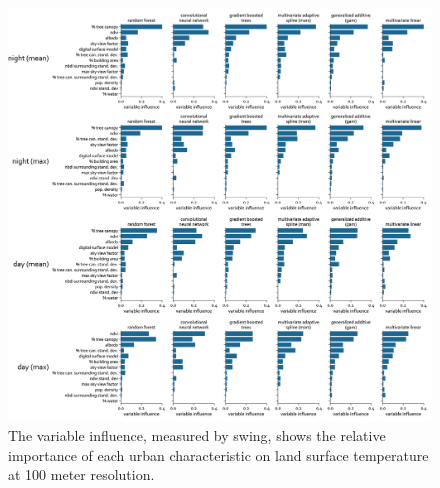 \documentclass[final,3p,times,twocolumn,sort&compress]{elsarticle}
\begin{document}
\begin{figure}
    \begin{center}
    \includegraphics[width=\linewidth]{fig/report/importance_100.png}
    \caption[Variable influence on LST at 100 meter resolution]{
    The variable influence, measured by swing, shows the relative importance of each urban characteristic on land surface temperature at 100 meter resolution.}
    \label{fig:importance_100}
    \end{center}
\end{figure}
\end{document}
